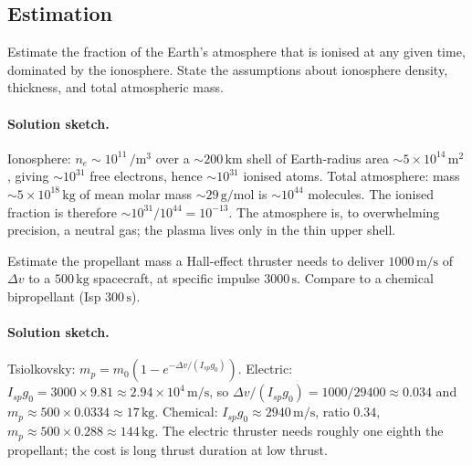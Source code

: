 \subsection*{Estimation}

\begin{exercise}
Estimate the fraction of the Earth's atmosphere that is ionised at
any given time, dominated by the ionosphere. State the assumptions
about ionosphere density, thickness, and total atmospheric mass.
\paragraph{Solution sketch.} Ionosphere: $n_{e}\sim 10^{11}\,\si{\per
\cubic\meter}$ over a $\sim 200\,\si{\kilo\meter}$ shell of Earth-radius
area $\sim 5\times 10^{14}\,\si{\meter\squared}$, giving $\sim
10^{31}$ free electrons, hence $\sim 10^{31}$ ionised atoms. Total
atmosphere: mass $\sim 5\times 10^{18}\,\si{\kilogram}$ of mean molar
mass $\sim 29\,\si{\gram\per\mole}$ is $\sim 10^{44}$ molecules. The
ionised fraction is therefore $\sim 10^{31}/10^{44} = 10^{-13}$. The
atmosphere is, to overwhelming precision, a neutral gas; the plasma lives
only in the thin upper shell.
\end{exercise}

\begin{exercise}
Estimate the propellant mass a Hall-effect thruster needs to deliver
$1000\,\si{\meter\per\second}$ of $\Delta v$ to a $500\,\si{\kilo
\gram}$ spacecraft, at specific impulse $3000\,\si{\second}$. Compare
to a chemical bipropellant (Isp $300\,\si{\second}$).
\paragraph{Solution sketch.} Tsiolkovsky: $m_{p} = m_{0}(1 -
e^{-\Delta v/(I_{sp}g_{0})})$. Electric: $I_{sp}g_{0} = 3000\times 9.81
\approx 2.94\times 10^{4}\,\si{\meter\per\second}$, so $\Delta v/(I_{sp}
g_{0}) = 1000/29400 \approx 0.034$ and $m_{p}\approx 500\times 0.0334
\approx 17\,\si{\kilogram}$. Chemical: $I_{sp}g_{0}\approx 2940\,\si{\meter
\per\second}$, ratio $0.34$, $m_{p}\approx 500\times 0.288 \approx
144\,\si{\kilogram}$. The electric thruster needs roughly one eighth the
propellant; the cost is long thrust duration at low thrust.
\end{exercise}

